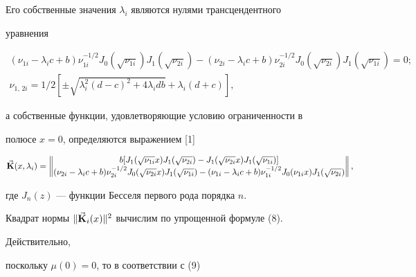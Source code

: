 \begin{exam}
Его собственные значения $\lambda_i$ являются нулями трансцендентного 


уравнения 


\begin{gather*} 


(\nu_{1i}-\lambda_i c+b)\nu^{-1/2}_{1i}J_0 


(\sqrt{\nu_{1i}})J_1(\sqrt{\nu_{2i}})-(\nu_{2i}- 


\lambda_i c+b)\nu^{-1/2}_{2i}J_0(\sqrt{\nu_{2i}}) 


J_1(\sqrt{\nu_{1i}})=0;\\ 


%


\nu_{1,\,2i}=1/2[\pm\sqrt{\lambda^2_i(d-c)^2+4\lambda_i d b}+ 


\lambda_i(d+c)], 


\end{gather*} 


а собственные функции, удовлетворяющие условию ограниченности в 


полюсе $x=0$, определяются выражением [1] 


\begin{equation} 


\vb{K}(x,\lambda_i)= 


\begin{Vmatrix} 


b[J_1(\sqrt{\nu_{1i}}x)J_1(\sqrt{\nu_{2i}})- 


J_1(\sqrt{\nu_{2i}}x)J_1(\sqrt{\nu_{1i}})] \\ 


(\nu_{2i}-\lambda_i c+b)\nu^{-1/2}_{2i}J_0 


(\sqrt{\nu_{2i}}x)J_1(\sqrt{\nu_{1i}})- 


(\nu_{1i}-\lambda_i c+b)\nu^{-1/2}_{1i}J_0 


(\nu_{1i}x)J_1(\sqrt{\nu_{2i}}) 


\end{Vmatrix} 


, 


\end{equation} 


где $J_n(z)$ --- функции Бесселя первого рода порядка $n$. 


 


Квадрат нормы $\|\Vec{\bold{K}}_i(x)\|^2$ вычислим по упрощенной формуле (8). 


Действительно, 


поскольку $\mu(0)=0$, то в соответствии с (9)\; 



\end{exam}
